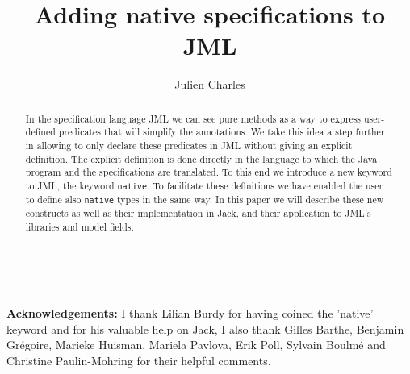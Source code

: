 \documentclass{llncs}
\begin{document}
%
%
\pagestyle{headings}  %


%
\title{Adding native specifications to JML}

\author{Julien Charles }


\maketitle

\begin{abstract}
In the specification language JML we can see pure methods as a way to 
express user-defined predicates that will simplify the annotations. 
We take this idea a step further in allowing 
to only declare these predicates in JML without giving an explicit definition.
The explicit definition is done directly in the language
to which the Java program and the specifications are 
translated. To this end we introduce a new keyword to JML, the keyword {\tt native}. 
To facilitate these definitions we have enabled the user to define 
also {\tt native} types in the same way.
In this paper we will describe these new constructs as well as their implementation in Jack, 
 and their application to JML's libraries and model fields.
\end{abstract}
%







\ \\
\begin{small}
\begin{it}
{\bf Acknowledgements:} I thank Lilian Burdy for having coined the 'native' keyword and 
for his valuable help on Jack, 
I also thank Gilles Barthe, Benjamin Gr\'egoire, Marieke Huisman, Mariela Pavlova, Erik Poll,
Sylvain Boulm\'e and Christine Paulin-Mohring for their helpful comments.
\end{it}
\end{small} 


%
%


\end{document}
